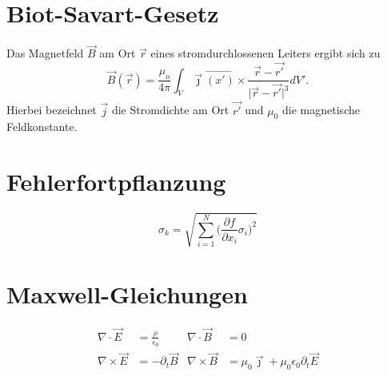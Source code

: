\documentclass{scrartcl}
\newcommand{\be}{\begin{equation}} %
\newcommand{\ee}{\end{equation}} %
\begin{document}
\section{Biot-Savart-Gesetz}
Das Magnetfeld $\vec{B}$ am Ort $\vec{r}$
eines stromdurchlossenen Leiters ergibt sich zu
 \be
    \vec{B}
    (\vec{r})
    =
    \frac{\mu_o}{4\pi}
    \int_V
    \vec{\jmath}
    \vec{(x')}
    \times \frac{\vec{r}-\vec{r'}}{\lvert \vec{r} - \vec{r'}\rvert^3} dV'.
      \ee
  Hierbei bezeichnet $\vec{j}$ die Stromdichte am Ort $\vec{r'}$
  und ${\mu_0}$ die magnetische Feldkonstante.

  \section{Fehlerfortpflanzung}
  \begin{equation}
    \sigma_k =
    \sqrt{\sum_{i=1}^N
    \Biggl(\frac{\partial{f}}{\partial{x_i}} \sigma_i \Biggr)^2}
  \end{equation}
  \section{Maxwell-Gleichungen}

  \begin{align}
    \nabla\cdot\vec{E} &= \frac{\rho}{\epsilon_0}  &  \nabla\cdot\vec{B} &= 0 \\
    \nabla\times\vec{E} &= -\partial_t\vec{B} & \nabla\times\vec{B} &= \mu_0\vec{\jmath}
    +\mu_0\epsilon_0\partial_t\vec{E}
\end{align}
\end{document}
